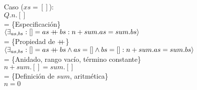 \documentclass[12pt]{article}
\newcommand{\concat}{%
  \mathbin{{+}\mspace{-8mu}{+}}%
}
\begin{document}
\begin{itemize}
    \bigbreak

    Caso ($xs = []$):\\
    $ Q.n.[] $\\
    = \{Especificación\}\\
    $ \langle\exists_{as,bs} : [] = as \concat bs : n + sum.as = sum.bs \rangle $\\
    = \{Propiedad de $\concat$\}\\
    $ \langle\exists_{as,bs} : [] = as \concat bs \land as = [] \land bs = [] : n + sum.as = sum.bs \rangle $\\
    = \{Anidado, rango vacío, término constante\}\\
    $ n + sum.[] = sum.[] $\\
    = \{Definición de $sum$, aritmética\}\\
    $ n = 0 $\\

    \bigbreak


\end{itemize}
\end{document}
